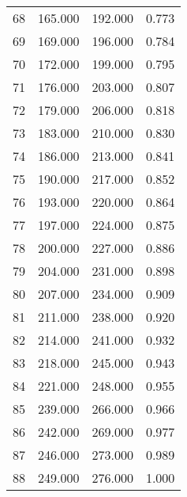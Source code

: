 \begin{tabular}{cccc}
  68 & 165.000 & 192.000 & 0.773 \\ 
  69 & 169.000 & 196.000 & 0.784 \\ 
  70 & 172.000 & 199.000 & 0.795 \\ 
  71 & 176.000 & 203.000 & 0.807 \\ 
  72 & 179.000 & 206.000 & 0.818 \\ 
  73 & 183.000 & 210.000 & 0.830 \\ 
  74 & 186.000 & 213.000 & 0.841 \\ 
  75 & 190.000 & 217.000 & 0.852 \\ 
  76 & 193.000 & 220.000 & 0.864 \\ 
  77 & 197.000 & 224.000 & 0.875 \\ 
  78 & 200.000 & 227.000 & 0.886 \\ 
  79 & 204.000 & 231.000 & 0.898 \\ 
  80 & 207.000 & 234.000 & 0.909 \\ 
  81 & 211.000 & 238.000 & 0.920 \\ 
  82 & 214.000 & 241.000 & 0.932 \\ 
  83 & 218.000 & 245.000 & 0.943 \\ 
  84 & 221.000 & 248.000 & 0.955 \\ 
  85 & 239.000 & 266.000 & 0.966 \\ 
  86 & 242.000 & 269.000 & 0.977 \\ 
  87 & 246.000 & 273.000 & 0.989 \\ 
  88 & 249.000 & 276.000 & 1.000 \\ 
   \hline
\end{tabular}
